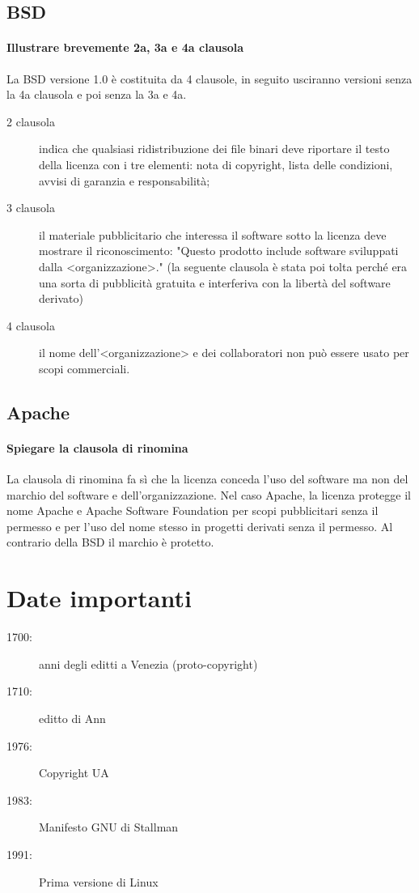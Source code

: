 \documentclass[a4paper]{article}
\begin{document}
		\subsection{BSD}
		
			\paragraph{Illustrare brevemente 2a, 3a e 4a clausola}
				La BSD versione 1.0 è costituita da 4 clausole, in seguito usciranno versioni senza la 4a clausola e poi senza la 3a e 4a.
				\begin{description}
					\item[2 clausola] indica che qualsiasi ridistribuzione dei file binari deve riportare il testo della licenza con i tre elementi: nota di copyright, lista delle condizioni, avvisi di garanzia e responsabilità;
					\item[3 clausola] il materiale pubblicitario che interessa il software sotto la licenza deve mostrare il riconoscimento:  "Questo prodotto include software sviluppati dalla <organizzazione>." (la seguente clausola è stata poi tolta perché era una sorta di pubblicità gratuita e interferiva con la libertà del software derivato)
					\item[4 clausola] il nome dell'<organizzazione> e dei collaboratori non può essere usato per scopi commerciali.
				\end{description}
			
		\subsection{Apache}
		
			\paragraph{Spiegare la clausola di rinomina}
				La clausola di rinomina fa sì che la licenza conceda l'uso del software ma non del marchio del software e dell'organizzazione.
				Nel caso Apache, la licenza protegge il nome Apache e Apache Software Foundation per scopi pubblicitari senza il permesso e per l'uso del nome stesso in progetti derivati senza il permesso. Al contrario della BSD il marchio è protetto.	

	\section{Date importanti}
	
	\begin{description}
		\item[1700:] anni degli editti a Venezia (proto-copyright)
		\item[1710:] editto di Ann
		\item[1976:] Copyright UA
		\item[1983:] Manifesto GNU di Stallman
		\item[1991:] Prima versione di Linux
	\end{description}
	
\end{document}
